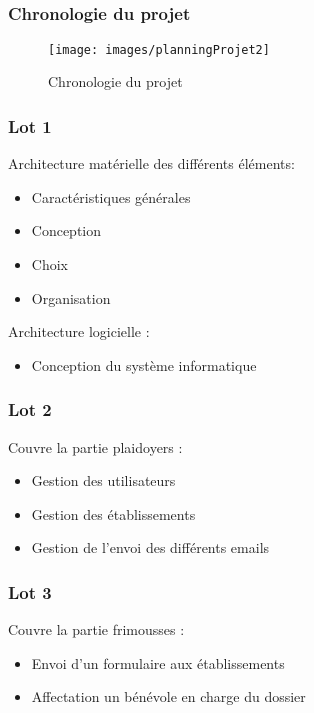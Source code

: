 
\speaker{\Mathieu}
\subsection{} %


\begin{frame}
	\frametitle{Chronologie du projet}
	\begin{figure}
		\begin{landscape}
		\texttt{[image: images/planningProjet2]}
		\end{landscape}
        \caption{Chronologie du projet}
	\end{figure} 
\end{frame}




\begin{frame}
	\frametitle{Lot 1}
	Architecture matérielle des différents éléments:
		\begin{itemize}
		\item Caractéristiques générales
		\item Conception
		\item Choix		
		\item Organisation
	\end{itemize}
	Architecture logicielle :
		\begin{itemize}
		\item Conception du système informatique
	\end{itemize}
\end{frame}


\speaker{\Michel}
\begin{frame}
	\frametitle{Lot 2}
	Couvre la partie plaidoyers :
	\begin{itemize}
		\item Gestion des utilisateurs
		\item Gestion des établissements
		\item Gestion de l'envoi des différents emails
	\end{itemize}
\end{frame}

\begin{frame}
	\frametitle{Lot 3}
	Couvre la partie frimousses :
	\begin{itemize}
		\item Envoi d'un formulaire aux établissements
		\item Affectation un bénévole en charge du dossier
	\end{itemize}
\end{frame}


